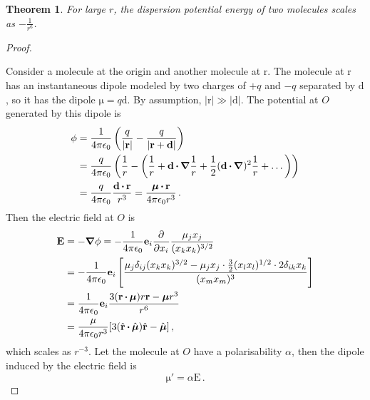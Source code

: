 \documentclass{article}
\theoremstyle{plain}\theoremheaderfont{\normalfont\itshape}\theorembodyfont{\rmfamily}\theoremseparator{.}\newtheorem*{rem}{Remark}\newtheorem*{ex}{Example}\newtheorem*{proof}{Proof}\newtheorem*{altp}{Alternative proof}
\theoremstyle{plain}\theoremheaderfont{\normalfont\bfseries}\theorembodyfont{\rmfamily}\theoremseparator{.}\newtheorem{thm}{Theorem}[section]\newtheorem{lem}[thm]{Lemma}\newtheorem{prop}[thm]{Proposition}\newtheorem*{cor}{Corollary}\newtheorem{defn}[thm]{Definition}\newtheorem{clm}[thm]{Claim}\newtheorem{clminproof}{Claim}\newtheorem{pos}{Postulate}[section]
\theoremstyle{break}\theoremheaderfont{\normalfont\itshape}\theorembodyfont{\rmfamily}\theoremseparator{.\medskip}\newtheorem*{proofskip}{Proof}\newtheorem*{exs}{Examples}\newtheorem*{rems}{Remarks}
\theoremstyle{break}\theoremheaderfont{\normalfont\bfseries}\theorembodyfont{\rmfamily}\theoremseparator{.\medskip}\newtheorem{lemskip}[thm]{Lemma}\newtheorem{defnskip}[thm]{Definition}\newtheorem{propskip}[thm]{Proposition}\newtheorem{thmskip}[thm]{Theorem}
\numberwithin{equation}{section}
\newcommand{\pdv}[3][]{\frac{\partial^{#1} #2}{{\partial #3}^{#1}}}
\newcommand{\vb}[1]{\bm{\mathrm{#1}}}
\newcommand{\vu}[1]{\hat{\bm{\mathrm{#1}}}}
\newcommand{\vdot}{\,\bm{\mathrm{\cdot}}\,}
\newcommand{\abs}[1]{\left| #1 \right|}
\newcommand{\grad}{\vb{\nabla}}
\begin{document}
    \begin{thm}
        For large \(r\), the dispersion potential energy of two molecules scales as \(-\frac{1}{r^6}\).
    \end{thm}
    \begin{proof}
        \begin{figure}[ht!]
            \centering
        \end{figure}

        Consider a molecule at the origin and another molecule at \(\vb{r}\). The molecule at \(\vb{r}\) has an instantaneous dipole modeled by two charges of \(+q\) and \(-q\) separated by \(\vb{d}\), so it has the dipole \(\vb{\mu}=q\vb{d}\). By assumption, \(\abs{\vb{r}}\gg\abs{\vb{d}}\). The potential at \(O\) generated by this dipole is
        \begin{align}
            \phi&=\frac{1}{4\pi\epsilon_0}\left(\frac{q}{\abs{\vb{r}}}-\frac{q}{\abs{\vb{r}+\vb{d}}}\right)\notag\\
            &=\frac{q}{4\pi\epsilon_0}\left(\frac{1}{r}-\left(\frac{1}{r}+\vb{d}\vdot\grad\frac{1}{r}+\frac{1}{2}(\vb{d}\vdot\grad)^2\frac{1}{r}+\dots\right)\right)\notag\\
            &=\frac{q}{4\pi\epsilon_0}\frac{\vb{d}\vdot\vb{r}}{r^3}=\frac{\vb{\mu}\vdot\vb{r}}{4\pi\epsilon_0 r^3}\,.
        \end{align}
        Then the electric field at \(O\) is
        \begin{align}
            \vb{E}&=-\grad\phi=-\frac{1}{4\pi\epsilon_0}\vb{e}_i\pdv{}{x_i}\frac{\mu_j x_j}{(x_kx_k)^{3/2}}\notag\\
            &=-\frac{1}{4\pi\epsilon_0}\vb{e}_i\left[\frac{\mu_j\delta_{ij}(x_kx_k)^{3/2}-\mu_j x_j\cdot\frac{3}{2}(x_lx_l)^{1/2}\cdot 2\delta_{ik}x_k}{(x_mx_m)^3}\right]\notag\\
            &=\frac{1}{4\pi\epsilon_0}\vb{e}_i\frac{3(\vb{r}\vdot\vb{\mu})r\vb{r}-\vb{\mu} r^3}{r^6}\notag\\
            &=\frac{\mu}{4\pi\epsilon_0 r^3}[3(\vu{r}\vdot\vu{\mu})\vu{r}-\vu{\mu}]\,,
        \end{align}
        which scales as \(r^{-3}\). Let the molecule at \(O\) have a polarisability \(\alpha\), then the dipole induced by the electric field is
        \begin{equation}
            \vb{\mu}'=\alpha\vb{E}\,.
        \end{equation}
        

\end{proof}
\end{document}
